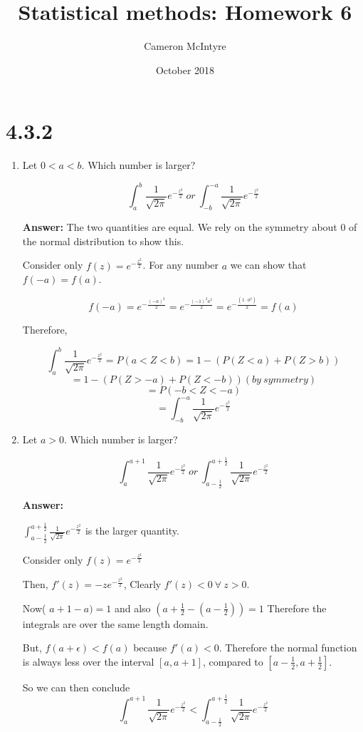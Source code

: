 \documentclass[svgnames]{article}
\title{Statistical methods: Homework 6}
\author{Cameron McIntyre}
\date{October 2018}
\begin{document}
\maketitle

\section{4.3.2}
\begin{enumerate}[label=(\alph*)]
\item Let $0<a<b$. Which number is larger?

$$\int^{b}_{a}\frac{1}{\sqrt{2\pi}}e^{-\frac{z^2}{2}} \ or\  \int^{-a}_{-b}\frac{1}{\sqrt{2\pi}}e^{-\frac{z^2}{2}}$$

\textbf{Answer:}
The two quantities are equal. We rely on the symmetry about 0 of the normal distribution to show this.

Consider only $f(z) = e^{-\frac{z^2}{2}}$. For any number $a$ we can show that $f(-a)=f(a)$.

$$f(-a) = e^{-\frac{(-a)^2}{2}} = e^{-\frac{(-1)^2a^2}{2}} = e^{-\frac{(1\cdot a^2)}{2}} = f(a) $$

Therefore,

\[ \int^{b}_{a}\frac{1}{\sqrt{2\pi}}e^{-\frac{z^2}{2}}=P(a<Z<b) = 1 - (P(Z<a) + P(Z > b))\]
\[= 1 - (P(Z> -a) + P(Z < - b)) (by \ symmetry) \]
\[= P(-b < Z < -a) \]
\[= \int^{-a}_{-b}\frac{1}{\sqrt{2\pi}}e^{-\frac{z^2}{2}} \]

\item Let $a>0$. Which number is larger?

$$\int^{a+1}_{a}\frac{1}{\sqrt{2\pi}}e^{-\frac{z^2}{2}} \ or\  \int^{a+\frac{1}{2}}_{a-\frac{1}{2}}\frac{1}{\sqrt{2\pi}}e^{-\frac{z^2}{2}}$$

\textbf{Answer:}

 $\int^{a+\frac{1}{2}}_{a-\frac{1}{2}}\frac{1}{\sqrt{2\pi}}e^{-\frac{z^2}{2}}$ is the larger quantity.
 
Consider only $f(z) = e^{-\frac{z^2}{2}}$

Then, $f'(z)=-z e^{-\frac{z^2}{2}}$, Clearly $f'(z)<0 \ \forall \  z >0 $.

Now( $a+1-a )=1$ and also $(a+\frac{1}{2} - (a-\frac{1}{2}))=1$ Therefore the integrals are over the same length domain.

But, $f(a+\epsilon)<f(a)$ because $f'(a)<0$. Therefore the normal function is always less over the interval $[a, a+1]$, compared to $[a-\frac{1}{2}, a+\frac{1}{2}]$. 

So we can then conclude
$$\int^{a+1}_{a}\frac{1}{\sqrt{2\pi}}e^{-\frac{z^2}{2}} <  \int^{a+\frac{1}{2}}_{a-\frac{1}{2}}\frac{1}{\sqrt{2\pi}}e^{-\frac{z^2}{2}}$$

\end{enumerate}
\end{document}
